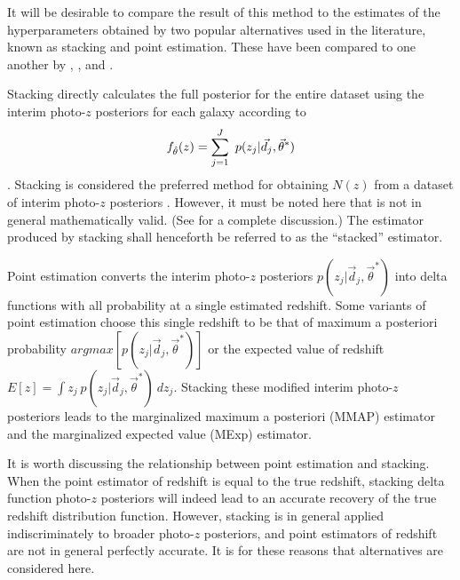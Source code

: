 It will be desirable to compare the result of this method to the estimates of the hyperparameters obtained by two popular alternatives used in the literature, known as stacking and point estimation.   
These have been compared 
to one another by \citet{Hildebrandt2012}, \citet{Benjamin2013}, and \citet{Asorey2016}.

Stacking directly calculates the full posterior for the entire dataset using the interim photo-$z$ posteriors for each galaxy according to 
\begin{equation}
\eqlabel{eq:stack}
f_{\hat{\theta}}(z) = \sum_{j=1}^{J}\ p(z_{j}|\vec{d}_{j},\vec{\theta}^{*})
\end{equation}
\citep{Lima2008}.  
Stacking is considered the preferred method for obtaining $N(z)$ from a dataset of interim photo-$z$ posteriors \citep{Sheldon2012, Kelly2014, Benjamin2013, Bonnett2015a, Viironen2015, Asorey2016}.  
However, it must be noted here that  is not in general mathematically valid.  
(See \citet{Hogg2012} for a complete discussion.)  
The estimator produced by stacking shall henceforth be referred to as the ``stacked'' estimator.

Point estimation converts the interim photo-$z$ posteriors $p(z_{j}|\vec{d}_{j},\vec{\theta}^{*})$ into delta functions with all probability at a single estimated redshift.  
Some variants of point estimation choose this single redshift to be that of maximum a posteriori probability $argmax[p(z_{j}|\vec{d}_{j},\vec{\theta}^{*})]$ or the expected value of redshift $E[z]=\int z_{j}\ p(z_{j}|\vec{d}_{j},\vec{\theta}^{*})\ dz_{j}$.  
Stacking these modified interim photo-$z$ posteriors leads to the marginalized maximum a posteriori (MMAP) estimator and the marginalized expected value (MExp) estimator.

It is worth discussing the relationship between point estimation and stacking.  
When the point estimator of redshift is equal to the true redshift, stacking delta function photo-$z$ posteriors will indeed lead to an accurate recovery of the true redshift distribution function.  
However, stacking is in general applied indiscriminately to broader photo-$z$ posteriors, and point estimators of redshift are not in general perfectly accurate.  
It is for these reasons that alternatives are considered here.

